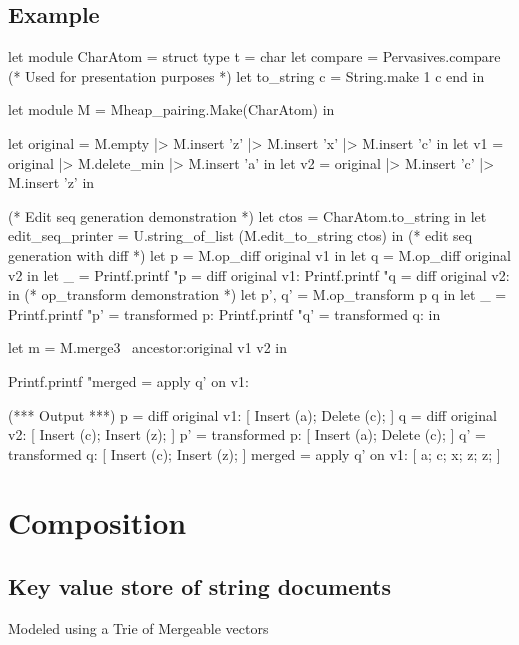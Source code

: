 \documentclass{article}
\begin{document}
\subsection{Example}\label{heap-example}
\begin{longlisting}
let module CharAtom = struct
  type t = char
  let compare = Pervasives.compare
  (* Used for presentation purposes *)
  let to_string c = String.make 1 c
end in

let module M = Mheap_pairing.Make(CharAtom) in

let original = M.empty |> M.insert 'z' |> M.insert 'x' |> M.insert 'c' in
let v1 = original |> M.delete_min |> M.insert 'a' in
let v2 = original |> M.insert 'c' |> M.insert 'z' in

(* Edit seq generation demonstration *)
let ctos = CharAtom.to_string in
let edit_seq_printer = U.string_of_list (M.edit_to_string ctos) in
(* edit seq generation with diff *)
let p = M.op_diff original v1 in
let q = M.op_diff original v2 in
let _ = 
  Printf.printf "p = diff original v1: %
  Printf.printf "q = diff original v2: %
in
(* op_transform demonstration *)
let p', q' = M.op_transform p q in
let _ = 
  Printf.printf "p' = transformed p: %
  Printf.printf "q' = transformed q: %
in

let m = M.merge3 ~ancestor:original v1 v2 in

Printf.printf "merged = apply q' on v1: %

(*** Output ***)
p = diff original v1: [ Insert (a); Delete (c); ]
q = diff original v2: [ Insert (c); Insert (z); ]
p' = transformed p: [ Insert (a); Delete (c); ]
q' = transformed q: [ Insert (c); Insert (z); ]
merged = apply q' on v1: [ a; c; x; z; z; ]
\end{longlisting}

\newpage
\section{Composition}
\subsection{Key value store of string documents}
Modeled using a Trie of Mergeable vectors
\end{document}
